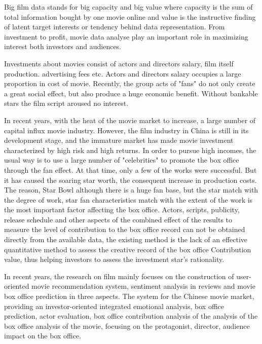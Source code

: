 \par Big film data stands for big capacity and big value where capacity is the sum of total information bought by one movie online and value is the instructive finding of latent target interests or tendency behind data representation. From investment to profit, movie data analyse play an important role in maximizing interest both investors and audiences.
\par Investments about movies consist of actors and directors salary,  film itself production. advertising fees etc. Actors and directors salary occupies a large proportion in cost of movie. Recently, the group acts of "fans" do not only create a great social effect, but also produce a huge economic benefit. Without bankable stars the film script aroused no interest.
\par In recent years, with the heat of the movie market to increase, a large number of capital influx movie industry. However, the film industry in China is still in its development stage, and the immature market has made movie investment characterized by high risk and high returns. In order to pursue high incomes, the usual way is to use a large number of "celebrities" to promote the box office through the fan effect. At that time, only a few of the works were successful. But it has caused the soaring star worth, the consequent increase in production costs. The reason, Star Bowl although there is a huge fan base, but the star match with the degree of work, star fan characteristics match with the extent of the work is the most important factor affecting the box office. Actors, scripts, publicity, release schedule and other aspects of the combined effect of the results to measure the level of contribution to the box office record can not be obtained directly from the available data, the existing method is the lack of an effective quantitative method to assess the creative record of the box office Contribution value, thus helping investors to assess the investment star's rationality.
\par In recent years, the research on film mainly focuses on the construction of user-oriented movie recommendation system\cite{diao2014jointly,tang2015user}, sentiment analysis in reviews\cite{manek2017aspect,kiritchenko2014sentiment,pang2008opinion} and movie box office prediction\cite{marshall2013forecasting,basuroy2003critical,asur2010predicting} in three aspects.
The system for the Chinese movie market, providing an investor-oriented integrated emotional analysis, box office prediction, actor evaluation, box office contribution analysis of the analysis of the box office analysis of the movie, focusing on the protagonist, director, audience impact on the box office.
